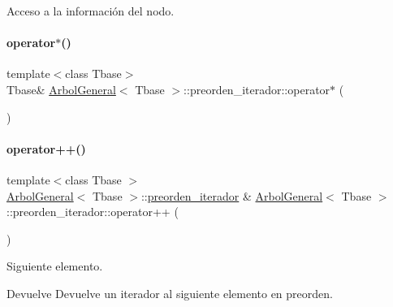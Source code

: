 Acceso a la información del nodo. 

\hypertarget{classArbolGeneral_1_1preorden__iterador_a2336e1008cac3a859337da8fc24075d0}{}\label{classArbolGeneral_1_1preorden__iterador_a2336e1008cac3a859337da8fc24075d0} 
\paragraph{\texorpdfstring{operator$\ast$()}{operator*()}\hspace{0.1cm}{\footnotesize\ttfamily [2/2]}}
{\footnotesize\ttfamily template$<$class Tbase$>$ \\
Tbase\& \hyperlink{classArbolGeneral}{Arbol\+General}$<$ Tbase $>$\+::preorden\+\_\+iterador\+::operator$\ast$ (\begin{DoxyParamCaption}{ }\end{DoxyParamCaption})\hspace{0.3cm}{\ttfamily [inline]}}

\hypertarget{classArbolGeneral_1_1preorden__iterador_a6ce61fb0ab8c1b0aa3bd91266618eeb5}{}\label{classArbolGeneral_1_1preorden__iterador_a6ce61fb0ab8c1b0aa3bd91266618eeb5} 
\paragraph{\texorpdfstring{operator++()}{operator++()}}
{\footnotesize\ttfamily template$<$class Tbase $>$ \\
\hyperlink{classArbolGeneral}{Arbol\+General}$<$ Tbase $>$\+::\hyperlink{classArbolGeneral_1_1preorden__iterador}{preorden\+\_\+iterador} \& \hyperlink{classArbolGeneral}{Arbol\+General}$<$ Tbase $>$\+::preorden\+\_\+iterador\+::operator++ (\begin{DoxyParamCaption}{ }\end{DoxyParamCaption})}



Siguiente elemento. 

\begin{DoxyReturn}{Devuelve}
Devuelve un iterador al siguiente elemento en preorden. 
\end{DoxyReturn}
\hypertarget{classArbolGeneral_1_1preorden__iterador_a79952609e35dd16830356a19b404abba}{}\label{classArbolGeneral_1_1preorden__iterador_a79952609e35dd16830356a19b404abba} 
